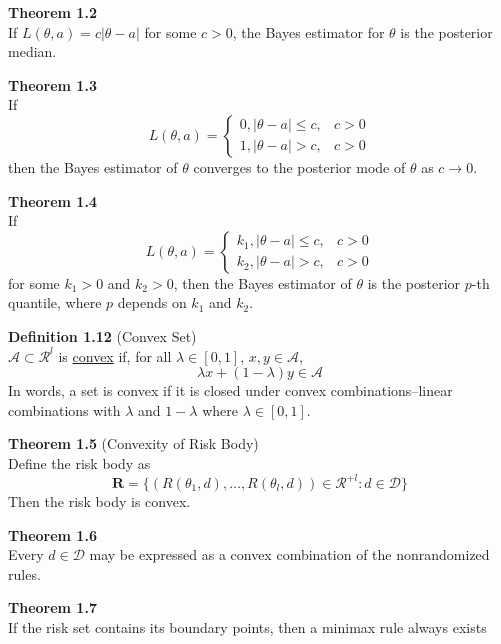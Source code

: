 \documentclass[12pt]{article}
\numberwithin{equation}{section}
\begin{document}
\textbf{Theorem 1.2} \\
If $L(\theta, a) = c \rvert \theta - a \lvert$ for some $c > 0$, the Bayes estimator for $\theta$ is the posterior median.

\textbf{Theorem 1.3} \\
If 
\begin{equation*}
  L(\theta, a) =
  \begin{cases}
    0, |\theta - a| \le c, & c > 0 \\
    1, |\theta - a| > c,   & c > 0
  \end{cases}
\end{equation*}
then the Bayes estimator of $\theta$ converges to the posterior mode of $\theta$ as $c \to 0$. 

\textbf{Theorem 1.4} \\
If
\begin{equation*}
  L(\theta, a) =
  \begin{cases}
    k_1, |\theta - a| \le c, & c > 0 \\
    k_2, |\theta - a| > c,   & c > 0
  \end{cases}
\end{equation*}
for some $k_1 > 0$ and $k_2 > 0$, then the Bayes estimator of $\theta$ is the posterior $p$-th quantile, where $p$ depends on $k_1$ and $k_2$.

\textbf{Definition 1.12} (Convex Set) \\
$\mathcal{A} \subset \mathcal{R}^l$ is \underline{convex} if, for all $\lambda \in [0, 1]$, $x, y \in \mathcal{A}$,
\begin{equation*}
  \lambda x + (1 - \lambda) y \in \mathcal{A}
\end{equation*}
In words, a set is convex if it is closed under convex combinations--linear combinations with $\lambda$ and $1 - \lambda$ where $\lambda \in [0, 1]$. 

\textbf{Theorem 1.5} (Convexity of Risk Body) \\
Define the risk body as
\begin{equation*}
  \mathbf{R} = \{(R(\theta_1, d), \ldots, R(\theta_l, d)) \in \mathcal{R}^{+l} : d \in \mathcal{D} \}
\end{equation*}
Then the risk body is convex.

\textbf{Theorem 1.6} \\
Every $d \in \mathcal{D}$ may be expressed as a convex combination of the nonrandomized rules.

\textbf{Theorem 1.7} \\
If the risk set contains its boundary points, then a minimax rule always exists
\end{document}
